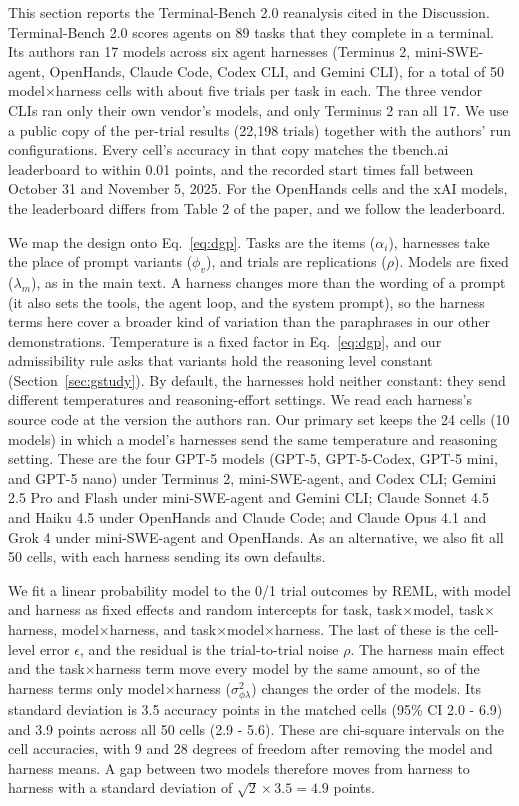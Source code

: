 This section reports the Terminal-Bench 2.0 reanalysis cited in the Discussion. Terminal-Bench 2.0 \citep{merrill2026terminalbench} scores agents on 89 tasks that they complete in a terminal. Its authors ran 17 models across six agent harnesses (Terminus 2, mini-SWE-agent, OpenHands, Claude Code, Codex CLI, and Gemini CLI), for a total of 50 model$\times$harness cells with about five trials per task in each. The three vendor CLIs ran only their own vendor's models, and only Terminus 2 ran all 17. We use a public copy of the per-trial results (22,198 trials) together with the authors' run configurations. Every cell's accuracy in that copy matches the tbench.ai leaderboard to within 0.01 points, and the recorded start times fall between October 31 and November 5, 2025. For the OpenHands cells and the xAI models, the leaderboard differs from Table 2 of the paper, and we follow the leaderboard.

We map the design onto Eq.~\ref{eq:dgp}. Tasks are the items ($\alpha_i$), harnesses take the place of prompt variants ($\phi_v$), and trials are replications ($\rho$). Models are fixed ($\lambda_m$), as in the main text. A harness changes more than the wording of a prompt (it also sets the tools, the agent loop, and the system prompt), so the harness terms here cover a broader kind of variation than the paraphrases in our other demonstrations. Temperature is a fixed factor in Eq.~\ref{eq:dgp}, and our admissibility rule asks that variants hold the reasoning level constant (Section~\ref{sec:gstudy}). By default, the harnesses hold neither constant: they send different temperatures and reasoning-effort settings. We read each harness's source code at the version the authors ran. Our primary set keeps the 24 cells (10 models) in which a model's harnesses send the same temperature and reasoning setting. These are the four GPT-5 models (GPT-5, GPT-5-Codex, GPT-5 mini, and GPT-5 nano) under Terminus 2, mini-SWE-agent, and Codex CLI; Gemini 2.5 Pro and Flash under mini-SWE-agent and Gemini CLI; Claude Sonnet 4.5 and Haiku 4.5 under OpenHands and Claude Code; and Claude Opus 4.1 and Grok 4 under mini-SWE-agent and OpenHands. As an alternative, we also fit all 50 cells, with each harness sending its own defaults.

We fit a linear probability model to the 0/1 trial outcomes by REML, with model and harness as fixed effects and random intercepts for task, task$\times$model, task$\times$harness, model$\times$harness, and task$\times$model$\times$harness. The last of these is the cell-level error $\epsilon$, and the residual is the trial-to-trial noise $\rho$. The harness main effect and the task$\times$harness term move every model by the same amount, so of the harness terms only model$\times$harness ($\sigma^2_{\phi\lambda}$) changes the order of the models. Its standard deviation is 3.5 accuracy points in the matched cells (95\% CI 2.0 - 6.9) and 3.9 points across all 50 cells (2.9 - 5.6). These are chi-square intervals on the cell accuracies, with 9 and 28 degrees of freedom after removing the model and harness means. A gap between two models therefore moves from harness to harness with a standard deviation of $\sqrt{2} \times 3.5 = 4.9$ points.

